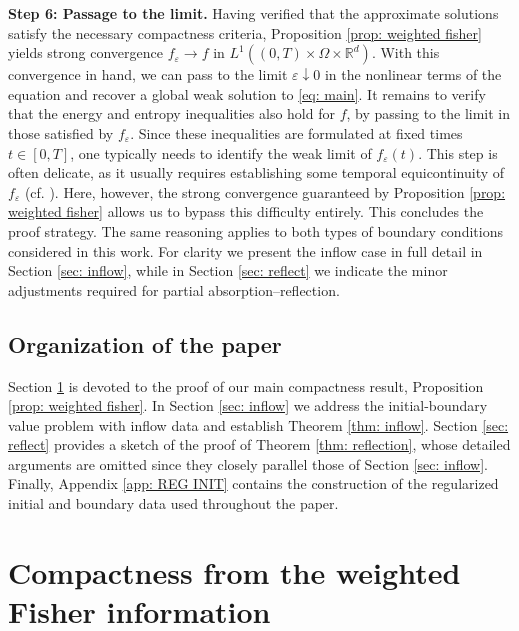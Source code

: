 \documentclass[10pt, reqno]{amsart}
\theoremstyle{plain}
\theoremstyle{definition}
\theoremstyle{remark}
\numberwithin{equation}{section}
\newcommand{\R}{\mathbb{R}}
\newcommand{\ve}{\varepsilon}
\begin{document}
\medskip

\noindent
\textbf{Step 6: Passage to the limit.}
Having verified that the approximate solutions satisfy the necessary compactness criteria, Proposition \ref{prop: weighted fisher} yields strong convergence $f_\ve \to f$ in $L^1((0,T)\times\Omega\times\R^d)$. With this convergence in hand, we can pass to the limit $\ve \downarrow 0$ in the nonlinear terms of the equation and recover a global weak solution to \eqref{eq: main}. It remains to verify that the energy and entropy inequalities also hold for $f$, by passing to the limit in those satisfied by $f_\ve$. Since these inequalities are formulated at fixed times $t\in[0,T]$, one typically needs to identify the weak limit of $f_\ve(t)$. This step is often delicate, as it usually requires establishing some temporal equicontinuity of ${f_\ve}$ (cf. \cite{GolseSaintRaymond05}). Here, however, the strong convergence guaranteed by Proposition \ref{prop: weighted fisher} allows us to bypass this difficulty entirely.  This concludes the proof strategy. The same reasoning applies to both types of boundary conditions considered in this work. For clarity we present the inflow case in full detail in Section \ref{sec: inflow}, while in Section \ref{sec: reflect} we indicate the minor adjustments required for partial absorption--reflection.

 


%
%
%
%
%
%
 


\subsection{Organization of the paper}

Section \ref{sec: comp} is devoted to the proof of our main compactness result, Proposition \ref{prop: weighted fisher}. 
In Section \ref{sec: inflow} we address the initial-boundary value problem with inflow data and establish Theorem \ref{thm: inflow}. 
Section \ref{sec: reflect} provides a sketch of the proof of Theorem \ref{thm: reflection}, whose detailed arguments are omitted since they closely parallel those of Section \ref{sec: inflow}. 
Finally, Appendix \ref{app: REG INIT} contains the construction of the regularized initial and boundary data used throughout the paper.

%
%
%
%
%
%
\section{Compactness from the weighted Fisher information} \label{sec: comp}
\end{document}
